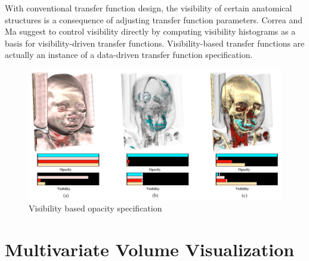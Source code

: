 With conventional transfer function design, the visibility of certain anatomical structures is a consequence of adjusting transfer function parameters. 
Correa and Ma suggest to control visibility directly by computing visibility histograms as a basis for visibility-driven transfer functions. Visibility-based transfer functions are actually an instance of a data-driven transfer function specification.

\cite{bordoloi_view_2005}
\cite{takahashi_feature-driven_2005}

\cite{emsenhuber_visibility_2008}
\cite{correa_visibility_2011}
\cite{wang_efficient_2011}

\cite{wan_fast_2010}

\begin{figure}
	\centering
	\includegraphics[width=1\linewidth]{images/wang_efficient_2011}
	\caption{Visibility based opacity specification \cite{wang_efficient_2011}}
	\label{fig:wang_efficient_2011}
\end{figure}

\cite{mak_visibility-aware_2011}

\cite{bronstad_visibility_2012}

\cite{jung_visibility-driven_2013}
\cite{zheng_visibility_2013}
\cite{ruiz_automatic_2011}
\cite{bramon_information_2013}

\cite{tang_depth-based_2011}
\cite{zhou_opacity_2014}

\section{Multivariate Volume Visualization}
\cite{kniss_volume_2002}
\cite{woodring_multi-variate_2006}
\cite{akiba_visualizing_2007}
\cite{lee_visualization_2009}
\cite{guo_scalable_2012}
\cite{khlebnikov_noise-based_2013}
\cite{liu_multivariate_2014}

